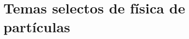 \documentclass[10pt]{book}
\begin{document}
 

 

\part{Temas selectos de física de partículas}








% 

\appendix

\end{document}
